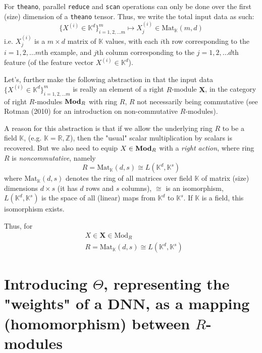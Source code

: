 \documentclass[10pt]{amsart}
\begin{document}
For \verb|theano|, parallel \verb|reduce| and \verb|scan| operations can only be done over the first (size) dimension of a \verb|theano| tensor\cite{theano}.  Thus, we write the total input data as such:
\begin{equation}
\lbrace X^{(i)} \in \mathbb{K}^d\rbrace^m_{i=1,2,\dots m} \mapsto X^{(i)}_j \in \text{Mat}_{\mathbb{K}}(m,d)
\end{equation}
i.e. $X^{(i)}_j$ is a $m\times d$ matrix of $\mathbb{K}$ values, with each $i$th row corresponding to the $i=1,2,\dots m$th example,  and $j$th column corresponding to the $j=1,2,\dots d$th feature (of the feature vector $X^{(i)} \in \mathbb{K}^d$).  

Let's, further make the following abstraction in that the input data $\lbrace X^{(i)} \in \mathbb{K}^d\rbrace^m_{i=1,2,\dots m}$ is really an element of a right $R$-module $\mathbf{X}$, in the category of right $R$-modules $\text{\textbf{Mod}}_R$ with ring $R$, $R$ not necessarily being commutative (see Rotman (2010) \cite{JRotman2010} for an introduction on non-commutative $R$-modules).    

A reason for this abstraction is that if we allow the underlying ring $R$ to be a field $\mathbb{K}$, (e.g. $\mathbb{K}=\mathbb{R},\mathbb{Z}$), then the "usual" scalar multiplication by scalars is recovered.  But we also need to equip $X\in \text{\textbf{Mod}}_R$ with a \emph{right action}, where ring $R$ is \emph{noncommutative}, namely 
\[
R = \text{Mat}_{\mathbb{K}}(d,s) \cong L(\mathbb{K}^d, \mathbb{K}^s)
\]
where $\text{Mat}_{\mathbb{K}}(d,s)$ denotes the ring of all matrices over field $\mathbb{K}$ of matrix (size) dimensions $d\times s$ (it has $d$ rows and $s$ columns), $\cong$ is an isomorphism, $L(\mathbb{K}^d,\mathbb{K}^s)$ is the space of all (linear) maps from $\mathbb{K}^d$ to $\mathbb{K}^s$.  If $\mathbb{K}$ is a field, this isomorphism exists.  

Thus, for 
\begin{equation}
\begin{aligned}
	& X\in \mathbf{X} \in \text{Mod}_R \\
	&  R = \text{Mat}_{\mathbb{K}}(d,s) \cong L(\mathbb{K}^d,\mathbb{K}^s)
\end{aligned}
\end{equation}

\section{Introducing $\Theta$, representing the "weights" of a DNN, as a mapping (homomorphism) between $R$-modules}
\end{document}
